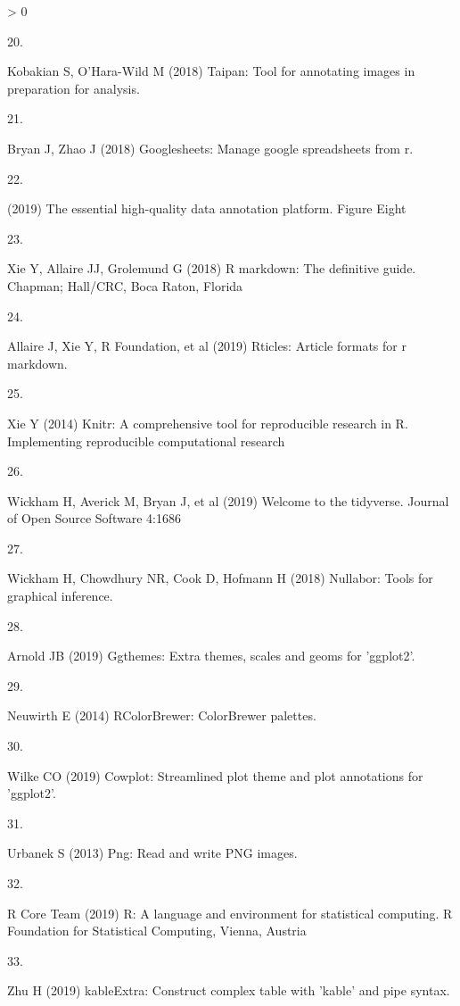 \documentclass[conference,final,]{IEEEtran}
\newlength{\csllabelwidth}
\newlength{\cslhangindent}
\newenvironment{CSLReferences}[3] %
 {%
  \setlength{\parindent}{0pt}
  \ifodd #1 \everypar{\setlength{\hangindent}{\cslhangindent}}\ignorespaces\fi
  \ifnum #2 > 0
  \setlength{\parskip}{#3\baselineskip}
  \fi
 }%
 {}
\newcommand{\CSLLeftMargin}[1]{\parbox[t]{\maxof{\widthof{#1}}{\csllabelwidth}}{#1}}
\newcommand{\CSLRightInline}[1]{\parbox[t]{\linewidth}{#1}}
\begin{document}
\begin{CSLReferences}{0}{0}
\leavevmode\hypertarget{ref-taipan}{}%
\CSLLeftMargin{20. }
\CSLRightInline{Kobakian S, O'Hara-Wild M (2018) Taipan: Tool for annotating images in preparation for analysis. }

\leavevmode\hypertarget{ref-sheets}{}%
\CSLLeftMargin{21. }
\CSLRightInline{Bryan J, Zhao J (2018) Googlesheets: Manage google spreadsheets from r. }

\leavevmode\hypertarget{ref-figeight}{}%
\CSLLeftMargin{22. }
\CSLRightInline{(2019) The essential high-quality data annotation platform. Figure Eight }

\leavevmode\hypertarget{ref-rmarkdown}{}%
\CSLLeftMargin{23. }
\CSLRightInline{Xie Y, Allaire JJ, Grolemund G (2018) R markdown: The definitive guide. Chapman; Hall/CRC, Boca Raton, Florida}

\leavevmode\hypertarget{ref-rticles}{}%
\CSLLeftMargin{24. }
\CSLRightInline{Allaire J, Xie Y, R Foundation, et al (2019) Rticles: Article formats for r markdown. }

\leavevmode\hypertarget{ref-knitr}{}%
\CSLLeftMargin{25. }
\CSLRightInline{Xie Y (2014) Knitr: A comprehensive tool for reproducible research in {R}. Implementing reproducible computational research }

\leavevmode\hypertarget{ref-tidyverse}{}%
\CSLLeftMargin{26. }
\CSLRightInline{Wickham H, Averick M, Bryan J, et al (2019) Welcome to the {tidyverse}. Journal of Open Source Software 4:1686}

\leavevmode\hypertarget{ref-nullabor}{}%
\CSLLeftMargin{27. }
\CSLRightInline{Wickham H, Chowdhury NR, Cook D, Hofmann H (2018) Nullabor: Tools for graphical inference. }

\leavevmode\hypertarget{ref-ggthemes}{}%
\CSLLeftMargin{28. }
\CSLRightInline{Arnold JB (2019) Ggthemes: Extra themes, scales and geoms for 'ggplot2'. }

\leavevmode\hypertarget{ref-RColorBrewer}{}%
\CSLLeftMargin{29. }
\CSLRightInline{Neuwirth E (2014) RColorBrewer: ColorBrewer palettes. }

\leavevmode\hypertarget{ref-cowplot}{}%
\CSLLeftMargin{30. }
\CSLRightInline{Wilke CO (2019) Cowplot: Streamlined plot theme and plot annotations for 'ggplot2'. }

\leavevmode\hypertarget{ref-png}{}%
\CSLLeftMargin{31. }
\CSLRightInline{Urbanek S (2013) Png: Read and write PNG images. }

\leavevmode\hypertarget{ref-grid}{}%
\CSLLeftMargin{32. }
\CSLRightInline{R Core Team (2019) R: A language and environment for statistical computing. R Foundation for Statistical Computing, Vienna, Austria}

\leavevmode\hypertarget{ref-kableExtra}{}%
\CSLLeftMargin{33. }
\CSLRightInline{Zhu H (2019) kableExtra: Construct complex table with 'kable' and pipe syntax. }

\end{CSLReferences}
\end{document}
